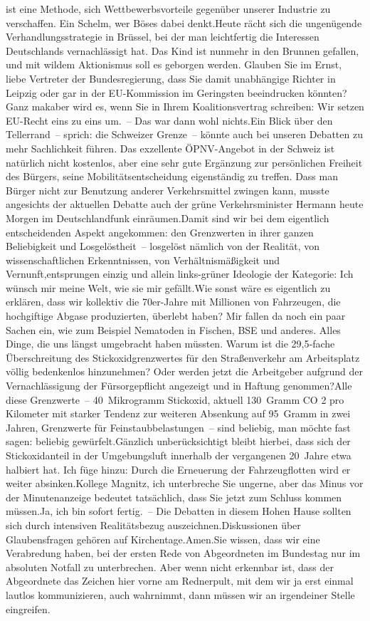 \documentclass{article}
\begin{document}
ist eine Methode, sich Wettbewerbsvorteile gegenüber unserer Industrie zu verschaffen. Ein Schelm, wer Böses dabei denkt.Heute rächt sich die ungenügende Verhandlungsstrategie in Brüssel, bei der man leichtfertig die Interessen Deutschlands vernachlässigt hat. Das Kind ist nunmehr in den Brunnen gefallen, und mit wildem Aktionismus soll es geborgen werden. Glauben Sie im Ernst, liebe Vertreter der Bundesregierung, dass Sie damit unabhängige Richter in Leipzig oder gar in der EU-Kommission im Geringsten beeindrucken könnten? Ganz makaber wird es, wenn Sie in Ihrem Koalitionsvertrag schreiben: Wir setzen EU-Recht eins zu eins um. – Das war dann wohl nichts.Ein Blick über den Tellerrand – sprich: die Schweizer Grenze – könnte auch bei unseren Debatten zu mehr Sachlichkeit führen. Das exzellente ÖPNV-Angebot in der Schweiz ist natürlich nicht kostenlos, aber eine sehr gute Ergänzung zur persönlichen Freiheit des Bürgers, seine Mobilitätsentscheidung eigenständig zu treffen. Dass man Bürger nicht zur Benutzung anderer Verkehrsmittel zwingen kann, musste angesichts der aktuellen Debatte auch der grüne Verkehrsminister Hermann heute Morgen im Deutschlandfunk einräumen.Damit sind wir bei dem eigentlich entscheidenden Aspekt angekommen: den Grenzwerten in ihrer ganzen Beliebigkeit und Losgelöstheit – losgelöst nämlich von der Realität, von wissenschaftlichen Erkenntnissen, von Verhältnismäßigkeit und Vernunft,entsprungen einzig und allein links-grüner Ideologie der Kategorie: Ich wünsch mir meine Welt, wie sie mir gefällt.Wie sonst wäre es eigentlich zu erklären, dass wir kollektiv die 70er-Jahre mit Millionen von Fahrzeugen, die hochgiftige Abgase produzierten, überlebt haben? Mir fallen da noch ein paar Sachen ein, wie zum Beispiel Nematoden in Fischen, BSE und anderes. Alles Dinge, die uns längst umgebracht haben müssten. Warum ist die 29,5‑fache Überschreitung des Stickoxidgrenzwertes für den Straßenverkehr am Arbeitsplatz völlig bedenkenlos hinzunehmen? Oder werden jetzt die Arbeitgeber aufgrund der Vernachlässigung der Fürsorgepflicht angezeigt und in Haftung genommen?Alle diese Grenzwerte – 40 Mikrogramm Stickoxid, aktuell 130 Gramm CO 2 pro Kilometer mit starker Tendenz zur weiteren Absenkung auf 95 Gramm in zwei Jahren, Grenzwerte für Feinstaubbelastungen – sind beliebig, man möchte fast sagen: beliebig gewürfelt.Gänzlich unberücksichtigt bleibt hierbei, dass sich der Stickoxidanteil in der Umgebungsluft innerhalb der vergangenen 20 Jahre etwa halbiert hat. Ich füge hinzu: Durch die Erneuerung der Fahrzeugflotten wird er weiter absinken.Kollege Magnitz, ich unterbreche Sie ungerne, aber das Minus vor der Minutenanzeige bedeutet tatsächlich, dass Sie jetzt zum Schluss kommen müssen.Ja, ich bin sofort fertig. – Die Debatten in diesem Hohen Hause sollten sich durch intensiven Realitätsbezug auszeichnen.Diskussionen über Glaubensfragen gehören auf Kirchentage.Amen.Sie wissen, dass wir eine Verabredung haben, bei der ersten Rede von Abgeordneten im Bundestag nur im absoluten Notfall zu unterbrechen. Aber wenn nicht erkennbar ist, dass der Abgeordnete das Zeichen hier vorne am Rednerpult, mit dem wir ja erst einmal lautlos kommunizieren, auch wahrnimmt, dann müssen wir an irgendeiner Stelle eingreifen.
\end{document}
